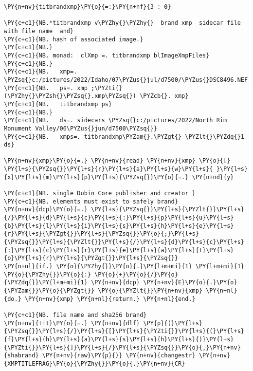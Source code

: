  \begin{tcolorbox}[breakable, size=fbox, boxrule=1pt, pad at break*=1mm,colback=cellbackground, colframe=cellborder]
\begin{Verbatim}[commandchars=\\\{\}]
\PY{n+nv}{titbrandxmp}\PY{o}{=:}\PY{n+nf}{3 : 0}

\PY{c+c1}{NB.*titbrandxmp v\PYZhy{}\PYZhy{}  brand xmp  sidecar file  with file name  and}
\PY{c+c1}{NB. hash of associated image.}
\PY{c+c1}{NB.}
\PY{c+c1}{NB. monad:  clXmp =. titbrandxmp blImageXmpFiles}
\PY{c+c1}{NB.}
\PY{c+c1}{NB.   xmp=. \PYZsq{}c:/pictures/2022/Idaho/07\PYZus{}jul/d7500/\PYZus{}DSC8496.NEF.xmp\PYZsq{}}
\PY{c+c1}{NB.   ps=. xmp ;\PYZti{} (\PYZhy{}\PYZsh{}\PYZsq{}.xmp\PYZsq{}) \PYZcb{}. xmp}
\PY{c+c1}{NB.   titbrandxmp ps}
\PY{c+c1}{NB.}
\PY{c+c1}{NB.   ds=. sidecars \PYZsq{}c:/pictures/2022/North Rim Monument Valley/06\PYZus{}jun/d7500\PYZsq{}}
\PY{c+c1}{NB.   xmps=. titbrandxmp\PYZam{}.\PYZgt{} \PYZlt{}\PYZdq{}1 ds}

\PY{n+nv}{xmp}\PY{o}{=.} \PY{n+nv}{read} \PY{n+nv}{xmp} \PY{o}{[} \PY{l+s}{\PYZsq{}}\PY{l+s}{r}\PY{l+s}{a}\PY{l+s}{w}\PY{l+s}{ }\PY{l+s}{x}\PY{l+s}{m}\PY{l+s}{p}\PY{l+s}{\PYZsq{}}\PY{o}{=.} \PY{n+nd}{y}

\PY{c+c1}{NB. single Dubin Core publisher and creator }
\PY{c+c1}{NB. elements must exist to safely brand}
\PY{n+nv}{dcp}\PY{o}{=.} \PY{l+s}{\PYZsq{}}\PY{l+s}{\PYZlt{}}\PY{l+s}{/}\PY{l+s}{d}\PY{l+s}{c}\PY{l+s}{:}\PY{l+s}{p}\PY{l+s}{u}\PY{l+s}{b}\PY{l+s}{l}\PY{l+s}{i}\PY{l+s}{s}\PY{l+s}{h}\PY{l+s}{e}\PY{l+s}{r}\PY{l+s}{\PYZgt{}}\PY{l+s}{\PYZsq{}}\PY{o}{;}\PY{l+s}{\PYZsq{}}\PY{l+s}{\PYZlt{}}\PY{l+s}{/}\PY{l+s}{d}\PY{l+s}{c}\PY{l+s}{:}\PY{l+s}{c}\PY{l+s}{r}\PY{l+s}{e}\PY{l+s}{a}\PY{l+s}{t}\PY{l+s}{o}\PY{l+s}{r}\PY{l+s}{\PYZgt{}}\PY{l+s}{\PYZsq{}}
\PY{n+nl}{if.} \PY{o}{\PYZhy{}}\PY{o}{.}\PY{l+m+mi}{1} \PY{l+m+mi}{1} \PY{o}{\PYZhy{}}\PY{o}{:} \PY{o}{+}\PY{o}{/}\PY{o}{\PYZdq{}}\PY{l+m+mi}{1} \PY{n+nv}{dcp} \PY{n+nv}{E}\PY{o}{.}\PY{o}{\PYZam{}}\PY{o}{\PYZgt{}} \PY{o}{\PYZlt{}}\PY{n+nv}{xmp} \PY{n+nl}{do.} \PY{n+nv}{xmp} \PY{n+nl}{return.} \PY{n+nl}{end.}

\PY{c+c1}{NB. file name and sha256 brand}
\PY{n+nv}{tit}\PY{o}{=.} \PY{n+nv}{dlf} \PY{p}{(}\PY{l+s}{\PYZsq{}}\PY{l+s}{/}\PY{l+s}{[}\PY{l+s}{\PYZti{}}\PY{l+s}{(}\PY{l+s}{f}\PY{l+s}{h}\PY{l+s}{a}\PY{l+s}{s}\PY{l+s}{h}\PY{l+s}{)}\PY{l+s}{\PYZti{}}\PY{l+s}{]}\PY{l+s}{/}\PY{l+s}{\PYZsq{}}\PY{o}{,}\PY{n+nv}{shabrand} \PY{n+nv}{raw}\PY{p}{)} \PY{n+nv}{changestr} \PY{n+nv}{XMPTITLEFRAG}\PY{o}{\PYZhy{}}\PY{o}{.}\PY{n+nv}{CR}


\end{Verbatim}
\end{tcolorbox}

